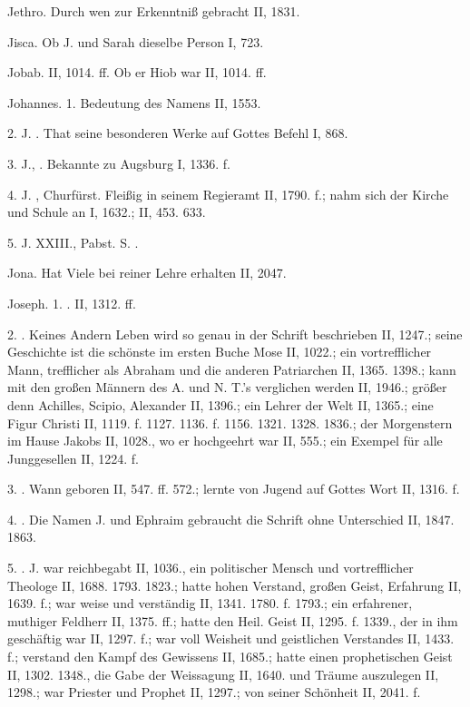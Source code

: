 Jethro. Durch wen zur Erkenntniß gebracht II, 1831.

Jisca. Ob J. und Sarah dieselbe Person I, 723.

Jobab. II, 1014. ff. Ob er Hiob war II, 1014. ff.

Johannes. 1. Bedeutung des Namens II, 1553.

2. J. . That seine besonderen Werke auf Gottes Befehl I, 868.

3. J., . Bekannte zu Augsburg I, 1336. f.

4. J. , Churfürst. Fleißig in seinem Regieramt II, 1790. f.; nahm sich der Kirche und Schule an I, 1632.; II, 453. 633.

5. J. XXIII., Pabst. S. .

Jona. Hat Viele bei reiner Lehre erhalten II, 2047.

Joseph. 1. . II, 1312. ff.

2. . Keines Andern Leben wird so genau in der Schrift beschrieben II, 1247.; seine Geschichte ist die schönste im ersten Buche Mose II, 1022.; ein vortrefflicher Mann, trefflicher als Abraham und die anderen Patriarchen II, 1365. 1398.; kann mit den großen Männern des A. und N. T.’s verglichen werden II, 1946.; größer denn Achilles, Scipio, Alexander II, 1396.; ein Lehrer der Welt II, 1365.; eine Figur Christi II, 1119. f. 1127. 1136. f. 1156. 1321. 1328. 1836.; der Morgenstern im Hause Jakobs II, 1028., wo er hochgeehrt war II, 555.; ein Exempel für alle Junggesellen II, 1224. f.

3. . Wann geboren II, 547. ff. 572.; lernte von Jugend auf Gottes Wort II, 1316. f.

4. . Die Namen J. und Ephraim gebraucht die Schrift ohne Unterschied II, 1847. 1863.

5. . J. war reichbegabt II, 1036., ein politischer Mensch und vortrefflicher Theologe II, 1688. 1793. 1823.; hatte hohen Verstand, großen Geist, Erfahrung II, 1639. f.; war weise und verständig II, 1341. 1780. f. 1793.; ein erfahrener, muthiger Feldherr II, 1375. ff.; hatte den Heil. Geist II, 1295. f. 1339., der in ihm geschäftig war II, 1297. f.; war voll Weisheit und geistlichen Verstandes II, 1433. f.; verstand den Kampf des Gewissens II, 1685.; hatte einen prophetischen Geist II, 1302. 1348., die Gabe der Weissagung II, 1640. und Träume auszulegen II, 1298.; war Priester und Prophet II, 1297.; von seiner Schönheit II, 2041. f.

